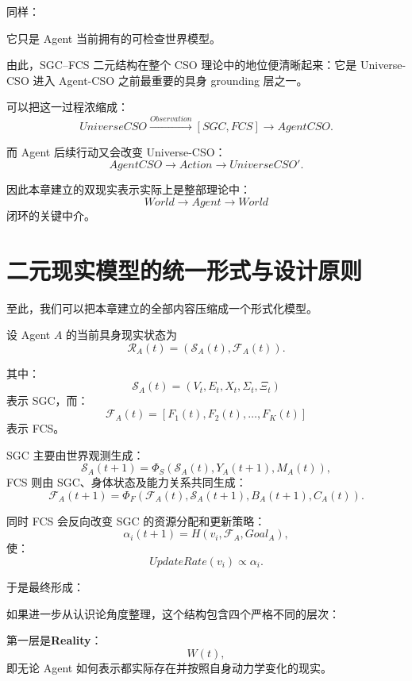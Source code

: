 同样：
\begin{statementbox}
\centering
{}
\end{statementbox}
它只是 Agent 当前拥有的可检查世界模型。

由此，SGC--FCS 二元结构在整个 CSO 理论中的地位便清晰起来：它是 Universe-CSO 进入 Agent-CSO 之前最重要的具身 grounding 层之一。

可以把这一过程浓缩成：
\[
UniverseCSO
\overset{Observation}{\longrightarrow}
\left[
SGC,
FCS
\right]
\longrightarrow
AgentCSO.
\]

而 Agent 后续行动又会改变 Universe-CSO：
\[
AgentCSO
\longrightarrow
Action
\longrightarrow
UniverseCSO'.
\]

因此本章建立的双现实表示实际上是整部理论中：
\[
World
\rightarrow
Agent
\rightarrow
World
\]
闭环的关键中介。


\section{二元现实模型的统一形式与设计原则}

至此，我们可以把本章建立的全部内容压缩成一个形式化模型。

设 Agent $A$ 的当前具身现实状态为
\[
\boxed{
\mathcal R_A(t)
=
\left(
\mathcal S_A(t),
\mathcal F_A(t)
\right).
}
\]

其中：
\[
\mathcal S_A(t)
=
\left(
V_t,E_t,X_t,\Sigma_t,\Xi_t
\right)
\]
表示 SGC，而：
\[
\mathcal F_A(t)
=
\left[
F_1(t),F_2(t),\ldots,F_K(t)
\right]
\]
表示 FCS。

SGC 主要由世界观测生成：
\[
\mathcal S_A(t+1)
=
\Phi_S
\left(
\mathcal S_A(t),
Y_A(t+1),
M_A(t)
\right),
\]
FCS 则由 SGC、身体状态及能力关系共同生成：
\[
\mathcal F_A(t+1)
=
\Phi_F
\left(
\mathcal F_A(t),
\mathcal S_A(t+1),
B_A(t+1),
C_A(t)
\right).
\]

同时 FCS 会反向改变 SGC 的资源分配和更新策略：
\[
\alpha_i(t+1)
=
H
\left(
v_i,
\mathcal F_A,
Goal_A
\right),
\]
使：
\[
UpdateRate(v_i)
\propto
\alpha_i.
\]

于是最终形成：
\begin{statementbox}
\centering
{}
\end{statementbox}

如果进一步从认识论角度整理，这个结构包含四个严格不同的层次：

第一层是\textbf{Reality}：
\[
W(t),
\]
即无论 Agent 如何表示都实际存在并按照自身动力学变化的现实。


